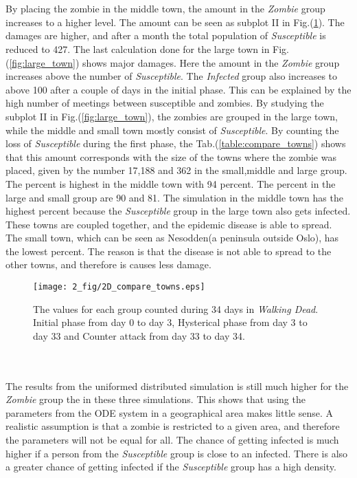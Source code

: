 \documentclass[%
twoside,                 %
final,                   %
chapterprefix=true,      %
open=right               %
10pt]{book}
\begin{document}
\\
\\
By placing the zombie in the middle town, the amount in the \emph{Zombie} group increases to a higher level. The amount can be seen as subplot II in Fig.(\ref{fig:compare_towns}). The damages are higher, and after a month the total population of \emph{Susceptible} is reduced to 427. The last calculation done for the large town in Fig.(\ref{fig:large_town}) shows major damages. Here the amount in the \emph{Zombie} group increases above the number of \emph{Susceptible}. The \emph{Infected} group also increases to above 100 after a couple of days in the initial phase. This can be explained by the high number of meetings between susceptible and zombies. By studying the subplot II in Fig.(\ref{fig:large_town}), the zombies are grouped in the large town, while the middle and small town mostly consist of \emph{Susceptible}. By counting the loss of \emph{Susceptible} during the first phase, the Tab.(\ref{table:compare_towns}) shows that this amount corresponds with the size of the towns where the zombie was placed, given by the number 17,188 and 362 in the small,middle and large group. The percent is highest in the middle town with 94 percent. The percent in the large and small group are 90 and 81.  The simulation in the middle town has the highest percent because the \emph{Susceptible} group in the large town also gets infected. These towns are coupled together, and the epidemic disease is able to spread. The small town, which can be seen as Nesodden(a peninsula outside Oslo), has the lowest percent. The reason is that the disease is not able to spread to the other towns, and therefore is causes less damage.  


\begin{figure}[ht]
  \centerline{\texttt{[image: 2\_fig/2D\_compare\_towns.eps]}}
  \caption{
  \label{fig:compare_towns} The values for each group counted during 34 days in \emph{Walking Dead}. Initial phase from day 0 to day 3, Hysterical phase from day 3 to day 33 and Counter attack from day 33 to day 34.
  }
\end{figure}


\\
\\
The results from the uniformed distributed simulation is still much higher for the \emph{Zombie} group the in these three simulations. This shows that using the parameters from the ODE system in a geographical area makes little sense. A realistic assumption is that a zombie is restricted to a given area, and therefore the parameters will not be equal for all. The chance of getting infected is much higher if a person from the  \emph{Susceptible} group is close to an infected. There is also a greater chance of getting infected if the \emph{Susceptible} group has a high density. 
\end{document}
